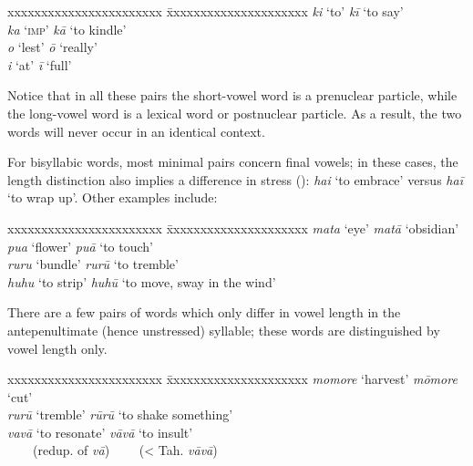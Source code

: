 \ea
\begin{tabbing}
 xxxxxxxxxxxxxxxxxxxxxxx \= xxxxxxxxxxxxxxxxxxxxx \kill
  \textit{ki}  ‘to’ \> \textit{kī}  ‘to say’\\
  \textit{ka}  ‘\textsc{imp}’ \> \textit{kā}  ‘to kindle’\\
\textit{{\ꞌ}o}  ‘lest’ \> \textit{{\ꞌ}ō}  ‘really’\\
 \textit{{\ꞌ}i}  ‘at’ \> \textit{{\ꞌ}ī}  ‘full’
\end{tabbing}
\z
Notice that in all these pairs the short-vowel word is a prenuclear particle, while the long-vowel word is a lexical word or postnuclear particle. As a result, the two words will never occur in an identical context.

For bisyllabic words, most minimal pairs concern final vowels; in these cases, the length distinction also implies a difference in stress (): \textit{ha{\ꞌ}i}  ‘to embrace’ versus \textit{ha{\ꞌ}ī}  ‘to wrap up’. Other examples include:

\ea
\begin{tabbing}
 xxxxxxxxxxxxxxxxxxxxxxx \= xxxxxxxxxxxxxxxxxxxxx \kill
  \textit{mata}  ‘eye’   \> \textit{matā}  ‘obsidian’\\
  \textit{pua}  ‘flower’   \> \textit{puā}  ‘to touch’\\
  \textit{ruru}  ‘bundle’   \> \textit{rurū}  ‘to tremble’\\
  \textit{huhu}  ‘to strip’  \>  \textit{huhū}  ‘to move, sway in the wind’
\end{tabbing}
\z
There are a few pairs of words which only differ in vowel length in the antepenultimate (hence unstressed) syllable; these words are distinguished by vowel length only.

\ea
\begin{tabbing}
 xxxxxxxxxxxxxxxxxxxxxxx \= xxxxxxxxxxxxxxxxxxxxx \kill
  \textit{momore}  ‘harvest’   \>  \textit{mōmore}  ‘cut’\\
   \textit{rurū}  ‘tremble’  \>  \textit{rūrū}  ‘to shake something’\\
  \textit{vavā}  ‘to resonate’  \>  \textit{vāvā}  ‘to insult’\\
    ~~~~(redup. of \textit{vā})     \>     ~~~~({\textless} Tah. \textit{vāvā})
\end{tabbing}
\z 
